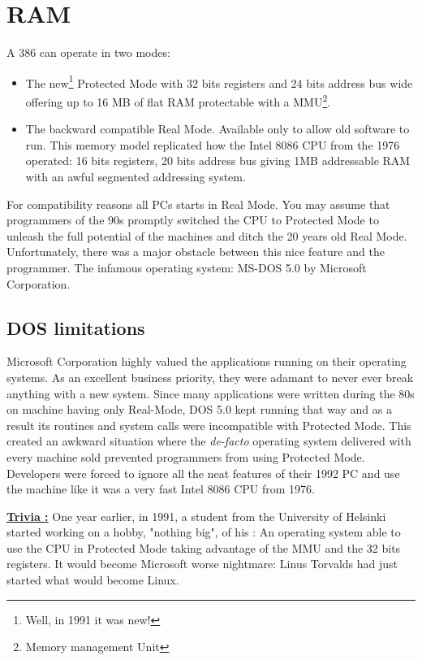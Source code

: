 \documentclass[book.tex]{subfiles}
\begin{document}
\section{RAM}
A 386 can operate in two modes:\\
\par
\begin{itemize}
  \item The new\footnote{Well, in 1991 it was new!} Protected Mode with  32 bits registers and 24 bits address bus wide offering up to 16 MB of flat RAM protectable with a MMU\footnote{Memory management Unit}.
  \item The backward compatible Real Mode. Available only to allow old software to run. This memory model replicated how the Intel 8086 CPU from the 1976 operated: 16 bits registers, 20 bits address bus giving 1MB addressable RAM with an awful segmented addressing system. 
\end{itemize}
For compatibility reasons all PCs starts in Real Mode. You may assume that programmers of the 90s promptly switched the CPU to Protected Mode to unleash the full potential of the machines and ditch the 20 years old Real Mode. Unfortunately, there was a major obstacle between this nice feature and the programmer. The infamous operating system: MS-DOS 5.0 by Microsoft Corporation.
  






  \subsection{DOS limitations}
  Microsoft Corporation highly valued the applications running on their operating systems. As an excellent business priority, they were adamant to never ever break anything with a new system.  Since many applications were written during the 80s on machine having only Real-Mode, DOS 5.0 kept running that way and as a result its routines and system calls were incompatible with Protected Mode. This created an awkward situation where the \emph{de-facto} operating system delivered with every machine sold prevented programmers from using Protected Mode. Developers were forced to ignore all the neat features of their 1992 PC and use the machine like it was a very fast Intel 8086 CPU from 1976.

\bigskip

 \textbf{\underline{Trivia :}} One year earlier, in 1991, a student from the University of Helsinki started working on a hobby, "nothing big", of his : An operating system able to use the CPU in Protected Mode taking advantage of the MMU and the 32 bits registers. It would become Microsoft worse nightmare: Linus Torvalds had just started what would become Linux.
\end{document}
